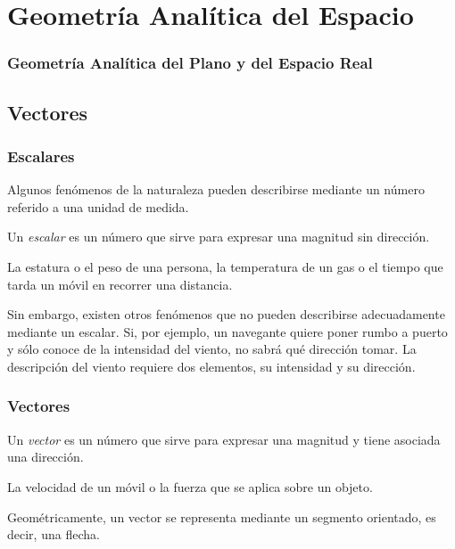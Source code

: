 \section{Geometría Analítica del Espacio}

\begin{frame}
\frametitle{Geometría Analítica del Plano y  del Espacio Real}
\setlength{\parskip}{0.3em}
\tableofcontents[sectionstyle=show/hide,hideothersubsections]
\end{frame}

\subsection{Vectores}

\begin{frame}
\frametitle{Escalares}
Algunos fenómenos de la naturaleza pueden describirse mediante un número referido a una unidad de medida. 

\begin{definicion}[Escalar]
Un \emph{escalar} es un número que sirve para expresar una magnitud sin dirección.
\end{definicion}
 La estatura o el peso de una persona, la temperatura de un gas o el tiempo que tarda un móvil en recorrer una distancia.

Sin embargo, existen otros fenómenos que no pueden describirse adecuadamente mediante un escalar. 
Si, por ejemplo, un navegante quiere poner rumbo a puerto y sólo conoce de la intensidad del viento, no sabrá qué dirección tomar. 
La descripción del viento requiere dos elementos, su intensidad y su dirección. 

\end{frame}


\begin{frame}
\frametitle{Vectores}
\begin{definicion}[Vector]
Un \emph{vector} es un número que sirve para expresar una magnitud y tiene asociada una dirección. 
\end{definicion}

 La velocidad de un móvil o la fuerza que se aplica sobre un objeto.  
 
Geométricamente, un vector se representa mediante un segmento orientado, es decir, una flecha.  
\begin{center}
\scalebox{0.8}{}
\end{center}
\end{frame}


